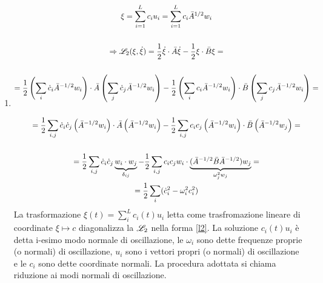 \documentclass[Main.tex]{subfiles}
\begin{document}
\begin{dm}
\begin{enumerate}
\item \begin{gather}
	\xi = \sum_{i=1}^L c_i u_i = \sum_{i=1}^L c_i \bar A^{1/2} w_i \notag\\ \ \notag \\ 
	\Rightarrow \notag \L_2 (\xi, \dot \xi ) = \frac{1}{2} \dot \xi \cdot \bar A \dot \xi - \frac{1}{2} \xi \cdot \bar B \xi =\\ \notag \ \notag \\ \notag
	= \frac{1}{2} \left( \sum_ i \dot c_i \bar A^{-1/2} w_i \right)\cdot \bar A \left(\sum_j \dot c_j \bar A^{-1/2} w_i \right) - \frac{1}{2} \left( \sum _i c_i \bar A^{-1/2} w_i \right) \cdot \bar B \left( \sum_j c_j \bar A^{-1/2} w_i \right)= \notag \\ \notag \ \\ \notag
	=\frac{1}{2} \sum_{i,j} \dot c_i \dot c_j \left( \bar A^{-1/2} w_i \right) \cdot \bar A \left( \bar A^{-1/2} w_i \right) - \notag \frac{1}{2} \sum_{i,j} c_i c_j \left( \bar A^{-1/2} w_i \right) \cdot \bar B \left( \bar A^{-1/2} w_j \right) = \notag\\ \notag \ \\
	= \frac{1}{2} \sum_{i,j} \dot c_i \dot c_j \underbrace{w_i \cdot w_j}_{\delta_{ij}} - \frac{1}{2} \sum_{i,j} c_i c_j w_i \cdot \underbrace{( \bar A^{-1/2} \bar B \bar A^{-1/2} ) w_j}_{\omega_j^2 w_j}=\notag \\
	= \frac{1}{2} \sum_{i} ( \dot c_i^2 -\omega_i^2 c_i^2) \label{l2}
\end{gather}
La trasformazione $\xi(t) = \sum_{i}^L c_i(t) u_i$ letta come trasfromazione lineare di coordinate $\xi \mapsto c$ diagonalizza la $\mathscr{L}_2$ nella forma \eqref{l2}. La soluzione $c_i (t) u_i$ è detta i-esimo modo normale di oscillazione, le $\omega_i$ sono dette frequenze proprie (o normali) di oscillazione, $u_i$ sono i vettori propri (o normali) di oscillazione e  le $c_i$ sono dette coordinate normali. La procedura adottata si chiama riduzione ai modi normali di oscillazione.
\end{enumerate}


\end{dm}
\end{document}

